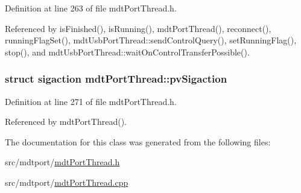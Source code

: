 Definition at line 263 of file mdt\-Port\-Thread.\-h.



Referenced by is\-Finished(), is\-Running(), mdt\-Port\-Thread(), reconnect(), running\-Flag\-Set(), mdt\-Usb\-Port\-Thread\-::send\-Control\-Query(), set\-Running\-Flag(), stop(), and mdt\-Usb\-Port\-Thread\-::wait\-On\-Control\-Transfer\-Possible().

\hypertarget{classmdt_port_thread_ae22f83fd56b06cdaa9b77abafe85a6b4}{
\subsubsection[{pv\-Sigaction}]{\setlength{\rightskip}{0pt plus 5cm}struct sigaction mdt\-Port\-Thread\-::pv\-Sigaction\hspace{0.3cm}{\ttfamily [protected]}}}\label{classmdt_port_thread_ae22f83fd56b06cdaa9b77abafe85a6b4}


Definition at line 271 of file mdt\-Port\-Thread.\-h.



Referenced by mdt\-Port\-Thread().



The documentation for this class was generated from the following files\-:\begin{DoxyCompactItemize}
\item 
src/mdtport/\hyperlink{mdt_port_thread_8h}{mdt\-Port\-Thread.\-h}\item 
src/mdtport/\hyperlink{mdt_port_thread_8cpp}{mdt\-Port\-Thread.\-cpp}\end{DoxyCompactItemize}
